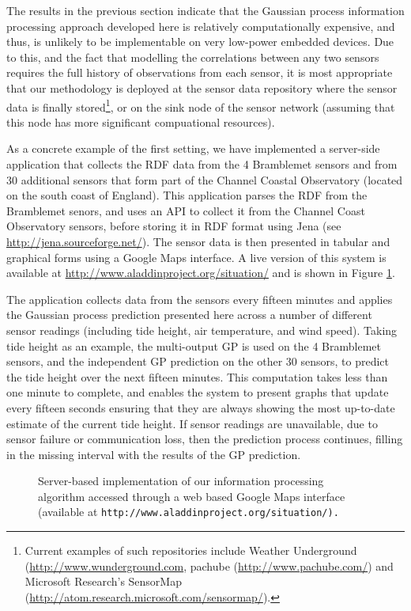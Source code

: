 \documentclass{acmsmall}
\begin{document}
\noindent The results in the previous section indicate that the Gaussian process information processing approach developed here is relatively computationally expensive, and thus, is unlikely to be implementable on very low-power embedded devices. Due to this, and the fact that modelling the correlations between any two sensors requires the full history of observations from each sensor, it is most appropriate that our methodology is deployed at the sensor data repository where the sensor data is finally stored\footnote{Current examples of such repositories include Weather Underground (\url{http://www.wunderground.com}, pachube (\url{http://www.pachube.com/}) and Microsoft Research's SensorMap (\url{http://atom.research.microsoft.com/sensormap/}).}, or on the sink node of the sensor network (assuming that this node has more significant compuational resources).

As a concrete example of the first setting, we have implemented a server-side application that collects the RDF data from the 4 Bramblemet sensors and from 30 additional sensors that form part of the Channel Coastal Observatory (located on the south coast of England). This application parses the RDF from the Bramblemet senors, and uses an API to collect it from the Channel Coast Observatory sensors, before storing it in RDF format using Jena (see \url{http://jena.sourceforge.net/}). The sensor data is then presented in tabular and graphical forms using a Google Maps interface. A live version of this system is available at \url{http://www.aladdinproject.org/situation/} and is shown in Figure \ref{screen}.

The application collects data from the sensors every fifteen minutes and applies the Gaussian process prediction presented here across a number of different sensor readings (including tide height, air temperature, and wind speed). Taking tide height as an example, the multi-output GP is used on the 4 Bramblemet sensors, and the independent GP prediction on the other 30 sensors, to predict the tide height over the next fifteen minutes. This computation takes less than one minute to complete, and enables the system to present graphs that update every fifteen seconds ensuring that they are always showing the most up-to-date estimate of the current tide height. If sensor readings are unavailable, due to sensor failure or communication loss, then the prediction process continues, filling in the missing interval with the results of the GP prediction.  

\begin{figure}
\begin{center}
\caption{Server-based implementation of our information processing algorithm accessed through a web based Google Maps interface (available at \tt{http://www.aladdinproject.org/situation/}).}
\label{screen}
\end{center}
\end{figure}
\end{document}

